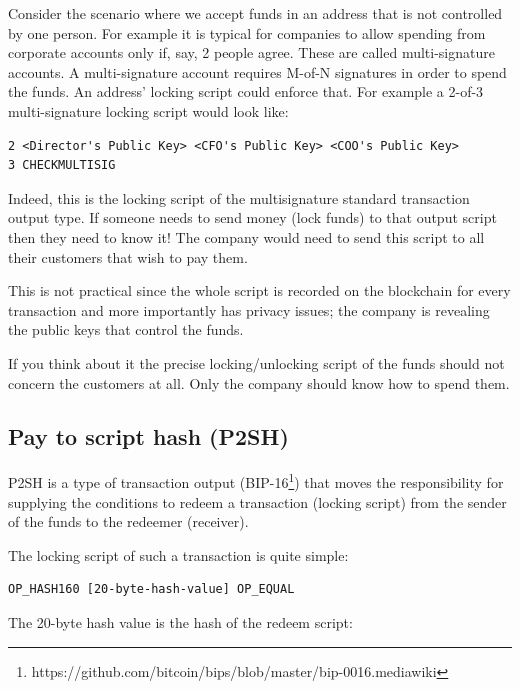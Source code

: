 Consider the scenario where we accept funds in an address that is not controlled by one person. For example it is typical for companies to allow spending from corporate accounts only if, say, 2 people agree. These are called multi-signature accounts. A multi-signature account requires M-of-N signatures in order to spend the funds. An address’ locking script could enforce that. For example a 2-of-3 multi-signature locking script would look like:

\begin{emphbox}
\begin{lstlisting}[style=Pseudomath]
2 <Director's Public Key> <CFO's Public Key> <COO's Public Key> 
3 CHECKMULTISIG
\end{lstlisting}
\end{emphbox}

Indeed, this is the locking script of the multisignature standard transaction output type. If someone needs to send money (lock funds) to that output script then they need to know it! The company would need to send this script to all their customers that wish to pay them.

This is not practical since the whole script is recorded on the blockchain for every transaction and more importantly has privacy issues; the company is revealing the public keys that control the funds.

If you think about it the precise locking/unlocking script of the funds should not concern the customers at all. Only the company should know how to spend them.


\subsection*{Pay to script hash (P2SH)}
P2SH is a type of transaction output (BIP-16\footnote{https://github.com/bitcoin/bips/blob/master/bip-0016.mediawiki}) that moves the responsibility for supplying the conditions to redeem a transaction (locking script) from the sender of the funds to the redeemer (receiver).

The locking script of such a transaction is quite simple:

\begin{emphbox}
\begin{lstlisting}[style=Pseudomath]
OP_HASH160 [20-byte-hash-value] OP_EQUAL
\end{lstlisting}
\end{emphbox}

The 20-byte hash value is the hash of the redeem script:

